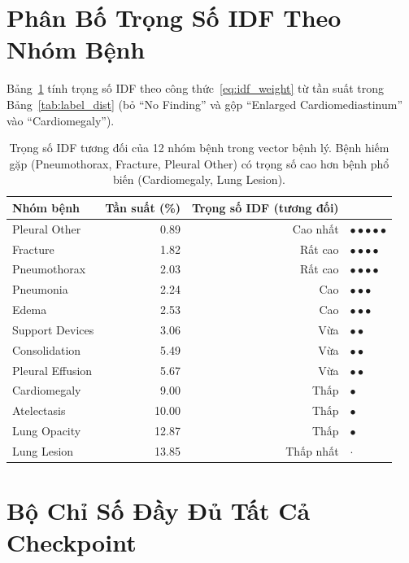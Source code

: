 \documentclass[12pt, a4paper]{article}
\begin{document}
\section{Phân Bố Trọng Số IDF Theo Nhóm Bệnh}
\label{app:idf}

Bảng~\ref{tab:idf_weights} tính trọng số IDF theo công thức~\eqref{eq:idf_weight}
từ tần suất trong Bảng~\ref{tab:label_dist} (bỏ ``No Finding'' và gộp
``Enlarged Cardiomediastinum'' vào ``Cardiomegaly'').

\begin{table}[H]
  \centering
  \caption{Trọng số IDF tương đối của 12 nhóm bệnh trong vector bệnh lý.
    Bệnh hiếm gặp (Pneumothorax, Fracture, Pleural Other) có trọng số cao hơn
    bệnh phổ biến (Cardiomegaly, Lung Lesion).}
  \label{tab:idf_weights}
  \begin{tabular}{lrrl}
    \toprule
    \textbf{Nhóm bệnh} & \textbf{Tần suất (\%)} & \textbf{Trọng số IDF (tương đối)} & \\
    \midrule
    Pleural Other           & 0.89 & Cao nhất  & $\bullet\bullet\bullet\bullet\bullet$ \\
    Fracture                & 1.82 & Rất cao   & $\bullet\bullet\bullet\bullet$ \\
    Pneumothorax            & 2.03 & Rất cao   & $\bullet\bullet\bullet\bullet$ \\
    Pneumonia               & 2.24 & Cao       & $\bullet\bullet\bullet$ \\
    Edema                   & 2.53 & Cao       & $\bullet\bullet\bullet$ \\
    Support Devices         & 3.06 & Vừa       & $\bullet\bullet$ \\
    Consolidation           & 5.49 & Vừa       & $\bullet\bullet$ \\
    Pleural Effusion        & 5.67 & Vừa       & $\bullet\bullet$ \\
    Cardiomegaly            & 9.00 & Thấp      & $\bullet$ \\
    Atelectasis             & 10.00 & Thấp     & $\bullet$ \\
    Lung Opacity            & 12.87 & Thấp     & $\bullet$ \\
    Lung Lesion             & 13.85 & Thấp nhất & $\cdot$ \\
    \bottomrule
  \end{tabular}
\end{table}

\section{Bộ Chỉ Số Đầy Đủ Tất Cả Checkpoint}
\label{app:all_checkpoints}
\end{document}
